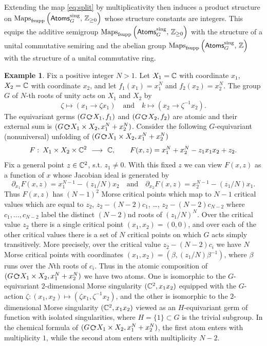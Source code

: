 \documentclass[twoside,leqno]{article}
\numberwithin{equation}{section}
\theoremstyle{plain}
\theoremstyle{definition}
\newtheorem{example}[equation]{Example}
\begin{document}
\medskip

Extending the map \eqref{eq:split} by multiplicativity then induces a  product structure
on \linebreak 
$\operatorname{Maps}_{\operatorname{fsupp}}\left( \mathsf{Atoms}_{G}^{\operatorname{sing}}, \, \mathbb Z_{\geq 0} 
\right)$  whose structure constants are integers. This equips the additive semigroup 
$\operatorname{Maps}_{\operatorname{fsupp}}\left( \mathsf{Atoms}_{G}^{\operatorname{sing}}, \, \mathbb Z_{\geq 0} 
\right)$ with the structure of a unital commutative semiring and the abelian group 
$\operatorname{Maps}_{\operatorname{fsupp}}\left( \mathsf{Atoms}_{G}^{\operatorname{sing}}, \, \mathbb Z 
\right)$ with the structure of a unital commutative ring.


\begin{example} \label{ex:TS} Fix a positive integer $N > 1$.
Let $X_{1} = \mathbb C$ with coordinate $x_{1}$, $X_{2} = \mathbb C$ with coordinate $x_{2}$, and
let $f_{1}(x_{1}) = x_{1}^{N}$ and $f_{2}(x_{2}) = x_{2}^{N}$. The group $G$ of $N$-th roots of unity acts on $X_{1}$ and $X_{2}$ by 
\[
\zeta \mapsto (x_{1}\to \zeta x_{1}) \quad \text{and}  \quad k \mapsto (x_{2}\to \zeta^{-1}x_{2}).
\]
The equivariant germs $(G\, \actleft\, X_{1},f_{1})$ and $(G\, \actleft\, X_{2},f_{2})$ are atomic and their external sum is 
$(G\, \actleft\, X_{1}\times X_{2},x_{1}^{N} + x_{2}^{N})$.
Consider the following $G$-equivariant (nonuniversal) unfolding of $(G\, \actleft\, X_{1}\times X_{2},x_{1}^{N} + x_{2}^{N})$
\[
F \, \colon \, X_{1}\times X_{2} \times \bbC^2 \ \longrightarrow \ \bbC, \qquad F(x,z) = x_{1}^{N} + x_{2}^{N} - z_{1}x_{1}x_{2} + z_{2}.
\]
Fix a general point $z\in \mathbb C^2$, s.t. $z_{1} \neq 0$. With this fixed $z$ we can view $F(x,z)$ as a function of $x$ whose Jacobian ideal is generated by 
\[
\partial_{x_{1}}F(x,z) = x_{1}^{N-1} - (z_{1}/N) x_{2} \quad  \text{and} 
\quad 
\partial_{x_{2}}F(x,z) = x_{2}^{N-1} - (z_{1}/N) x_{1}.
\]
Thus 
$F(x,z)$ has $(N-1)^2$ Morse critical points which map to $N-1$ critical values which are equal to $z_{2}$, $z_{2} - (N-2)c_{1}$, \ldots, $z_{2} - (N-2)c_{N-2}$ where $c_{1}, \ldots, c_{N-2}$ label the distinct $(N-2)$nd roots of $(z_{1}/N)^{N}$. 
Over the critical value $z_{2}$ there is a single critical point $(x_{1},x_{2}) = (0,0)$, and over each of the other critical values there is a set of $N$ critical points on which $G$ acts simply transitively. 
More precisely, over the critical value $z_{2} - (N-2)c_{i}$ we have $N$ Morse critical points with coordinates 
$(x_{1},x_{2}) = (\beta,(z_{1}/N)\beta^{-1})$, where $\beta$ runs over the $N$th roots of $c_{i}$.
Thus in the atomic composition of $(G\, \actleft\, X_{1}\times X_{2},x_{1}^{N} + x_{2}^{N})$ we have two atoms. One is isomorphic to the $G$-equivariant $2$-dimensional Morse singularity $(\mathbb C^2,x_{1}x_{2})$ equipped with the $G$-action $\zeta \colon (x_{1},x_{2}) \mapsto (\zeta x_{1},\zeta^{-1} x_{2})$, and the other  is isomorphic to the $2$-dimensional Morse singularity $(\mathbb C^2,x_{1}x_{2})$ viewed as an $H$-equivariant germ of function with isolated singularities, where $H = \{1\} \subset G$ is the trivial subgroup. In the chemical formula of $(G\, \actleft\, X_{1}\times X_{2},x_{1}^{N} + x_{2}^{N})$, the first atom enters with multiplicity $1$, while the second atom enters with multiplicity $N-2$.
\end{example}
\end{document}
